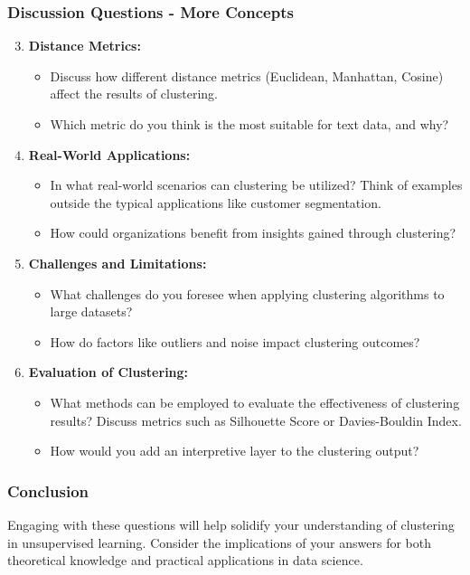\documentclass[aspectratio=169]{beamer}
\begin{document}
\begin{frame}[fragile]
  \frametitle{Discussion Questions - More Concepts}
  \begin{enumerate}
    \setcounter{enumi}{2}
    \item \textbf{Distance Metrics:}
        \begin{itemize}
            \item Discuss how different distance metrics (Euclidean, Manhattan, Cosine) affect the results of clustering.
            \item Which metric do you think is the most suitable for text data, and why?
        \end{itemize}
        
    \item \textbf{Real-World Applications:}
        \begin{itemize}
            \item In what real-world scenarios can clustering be utilized? Think of examples outside the typical applications like customer segmentation.
            \item How could organizations benefit from insights gained through clustering?
        \end{itemize}

    \item \textbf{Challenges and Limitations:}
        \begin{itemize}
            \item What challenges do you foresee when applying clustering algorithms to large datasets?
            \item How do factors like outliers and noise impact clustering outcomes?
        \end{itemize}

    \item \textbf{Evaluation of Clustering:}
        \begin{itemize}
            \item What methods can be employed to evaluate the effectiveness of clustering results? Discuss metrics such as Silhouette Score or Davies-Bouldin Index.
            \item How would you add an interpretive layer to the clustering output?
        \end{itemize}
  \end{enumerate}
\end{frame}

\begin{frame}[fragile]
  \frametitle{Conclusion}
  Engaging with these questions will help solidify your understanding of clustering in unsupervised learning. 
  Consider the implications of your answers for both theoretical knowledge and practical applications in data science.
\end{frame}
\end{document}
